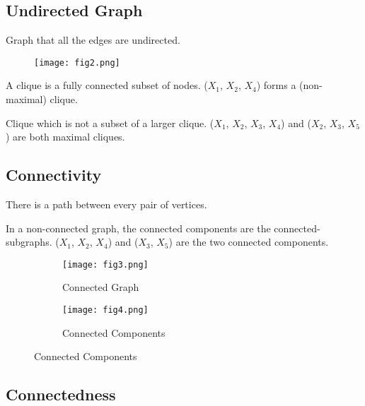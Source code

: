 \subsection{Undirected Graph}

\begin{description}[leftmargin=0cm]	
	\item[Undirected Graph] Graph that all the edges are undirected.
		\begin{figure*}[h]
			\centering
			\texttt{[image: fig2.png]}
		\end{figure*}
	\item[Clique] A clique is a fully connected subset of nodes. ($X_1$, $X_2$, $X_4$) forms a (non-maximal) clique.
	\item[Maximal Clique] Clique which is not a subset of a larger clique. ($X_1$, $X_2$, $X_3$, $X_4$) and ($X_2$, $X_3$, $X_5$) are both maximal cliques.
\end{description}

\subsection{Connectivity}

\begin{description}[leftmargin=0cm]	
	\item[Connected Graph] There is a path between every pair of vertices.
	\item[Connected Components] In a non-connected graph, the connected components are the connected-subgraphs. ($X_1$, $X_2$, $X_4$) and ($X_3$, $X_5$) are the two connected components.
		\begin{figure*}[h]
			\centering
			\begin{subfigure}[b]{0.45\textwidth}
				\centering
				\texttt{[image: fig3.png]}
				\caption*{Connected Graph}
			\end{subfigure}
			\begin{subfigure}[b]{0.45\textwidth}
				\centering
				\texttt{[image: fig4.png]}
				\caption*{Connected Components}
			\end{subfigure}
		\end{figure*}
\end{description}

\subsection{Connectedness}

